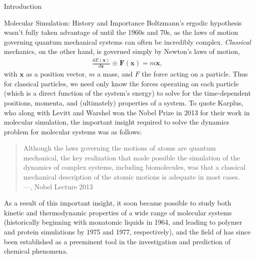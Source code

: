 \begin{chapter}{Introduction}
\begin{section}{Molecular Simulation: History and Importance}
Boltzmann's ergodic hypothesis wasn't fully taken advantage of until the 1960s
and 70s, as the laws of motion governing quantum mechanical systems can often
be incredibly complex. \emph{Classical} mechanics, on the other hand, is
governed simply by Newton's laws of motion,
%
\begin{align}
\label{eq:intro-newton}
\frac{d E(\bm x)}{d \bm x} \equiv \bm F(\bm x) = m \ddot{\bm x}, 
\end{align}
%
with $\bm x$ as a position vector, $m$ a mass, and $F$ the force acting on a
particle. Thus for classical particles, we need only know the forces operating
on each particle (which is a direct function of the system's energy) to solve for the
time-dependent positions, momenta, and (ultimately) properties of a system.
To quote Karplus, who along with Levitt and Warshel won the Nobel Prize in
2013 for their work in molecular simulation, the important insight required to solve the dynamics
problem for molecular systems was as follows:
%
\begin{quote}
Although the laws governing the motions of atoms are quantum mechanical, the
key realization that made possible the simulation of the dynamics of complex
systems, including biomolecules, was that a classical mechanical description
of the atomic motions is adequate in most cases.
\\ \phantom{abc} \hfill
---\citet{Karplus2014}, Nobel Lecture 2013
\end{quote}
%
As a result of this important insight, it soon became possible to study both kinetic and
thermodynamic properties of a wide range of molecular systems (historically beginning with monatomic
liquids in 1964, and leading to polymer and protein simulations by 1975 and
1977, respectively),\cite{VanGunsteren1990} and the field of \md has since
been established as a preeminent tool in the investigation and prediction of chemical
phenomena.%


\end{section}
\end{chapter}
